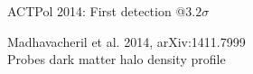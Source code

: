 \documentclass[table]{beamer}
\begin{document}
\begin{frame}{ACTPol 2014: First detection @$3.2\sigma$}
	\centering
	\hspace*{-1.2cm}
	Madhavacheril et al. 2014, arXiv:1411.7999 \\
	Probes dark matter halo density profile
\end{frame}

\end{document}
